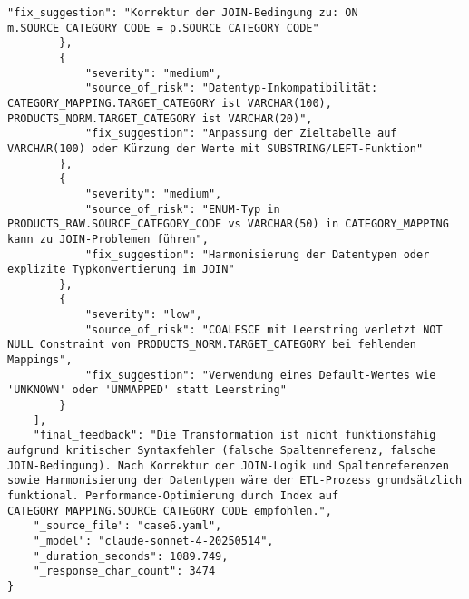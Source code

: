 \begin{lstlisting}[caption={Ausgabe: Claude Sonnet 4 Anwendungsfall 6 Hauptdurchlauf},label={claude_case6_prompt1}]
            "fix_suggestion": "Korrektur der JOIN-Bedingung zu: ON m.SOURCE_CATEGORY_CODE = p.SOURCE_CATEGORY_CODE"
        },
        {
            "severity": "medium",
            "source_of_risk": "Datentyp-Inkompatibilität: CATEGORY_MAPPING.TARGET_CATEGORY ist VARCHAR(100), PRODUCTS_NORM.TARGET_CATEGORY ist VARCHAR(20)",
            "fix_suggestion": "Anpassung der Zieltabelle auf VARCHAR(100) oder Kürzung der Werte mit SUBSTRING/LEFT-Funktion"
        },
        {
            "severity": "medium",
            "source_of_risk": "ENUM-Typ in PRODUCTS_RAW.SOURCE_CATEGORY_CODE vs VARCHAR(50) in CATEGORY_MAPPING kann zu JOIN-Problemen führen",
            "fix_suggestion": "Harmonisierung der Datentypen oder explizite Typkonvertierung im JOIN"
        },
        {
            "severity": "low",
            "source_of_risk": "COALESCE mit Leerstring verletzt NOT NULL Constraint von PRODUCTS_NORM.TARGET_CATEGORY bei fehlenden Mappings",
            "fix_suggestion": "Verwendung eines Default-Wertes wie 'UNKNOWN' oder 'UNMAPPED' statt Leerstring"
        }
    ],
    "final_feedback": "Die Transformation ist nicht funktionsfähig aufgrund kritischer Syntaxfehler (falsche Spaltenreferenz, falsche JOIN-Bedingung). Nach Korrektur der JOIN-Logik und Spaltenreferenzen sowie Harmonisierung der Datentypen wäre der ETL-Prozess grundsätzlich funktional. Performance-Optimierung durch Index auf CATEGORY_MAPPING.SOURCE_CATEGORY_CODE empfohlen.",
    "_source_file": "case6.yaml",
    "_model": "claude-sonnet-4-20250514",
    "_duration_seconds": 1089.749,
    "_response_char_count": 3474
}
\end{lstlisting}

